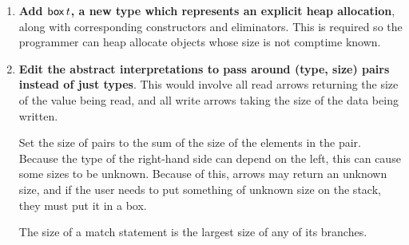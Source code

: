 \documentclass[12pt,twoside]{report}
\begin{document}
\begin{enumerate}
  \item \textbf{Add $\mathsf{box} \, t$, a new type which represents an explicit heap allocation}, along with corresponding constructors and eliminators. This is required so the programmer can heap allocate objects whose size is not comptime known.
  \item \textbf{Edit the abstract interpretations to pass around (type, size) pairs instead of just types}. This would involve all read arrows returning the size of the value being read, and all write arrows taking the size of the data being written.
  
  Set the size of pairs to the sum of the size of the elements in the pair. Because the type of the right-hand side can depend on the left, this can cause some sizes to be unknown. Because of this, arrows may return an unknown size, and if the user needs to put something of unknown size on the stack, they must put it in a box.

  The size of a match statement is the largest size of any of its branches.
\end{enumerate}




\end{document}
